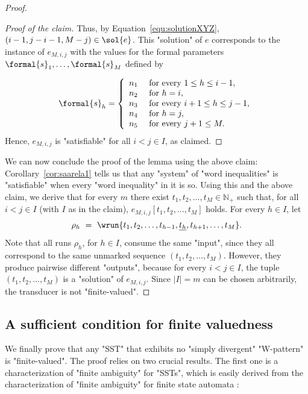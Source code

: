 \documentclass{theoretics}
\begin{document}
\begin{proof}
\begin{proof}[Proof of the claim]
Thus, by Equation~\eqref{equ:solutionXYZ},
$(i - 1, j - i - 1, M - j) \in \sol{e}$. 
This "solution" of $e$ corresponds to the instance of  $e_{M,i,j}$ 
with the values for the formal parameters $\formal{s}_1,\dots,\formal{s}_M$
defined by

\[
\formal{s}_h = \left\{
\begin{array}{lll}
n_1 & \textup{ for every } 1 \leq h \leq i-1,\\
n_2 & \textup{ for } h = i,\\
n_3 & \textup{ for every } i+1 \leq h \leq j-1,\\
n_4 & \textup{ for } h = j,\\
n_5 & \textup{ for every } j+1 \leq M.
\end{array}
\right.
\]
Hence, $e_{M,i,j}$ is "satisfiable" for all $i<j \in I$, as claimed.
\end{proof}

We can now conclude the proof of the lemma using the above claim:
Corollary~\ref{cor:saarela1} tells us that any "system" of "word inequalities" 
is "satisfiable" when every "word inequality" in it is so.
Using this and the above claim, we derive that for every $m$ there exist 
$t_1,t_2,\ldots,t_M \in \mathbb{N}_+$ such that, for all $i<j\in I$ (with $I$ as in the claim),
$e_{M,i,j}[t_1,t_2,\ldots,t_M]$ holds.
For every $h \in I$, let
\[
    \rho_h ~=~ 
    \wrun{t_1,t_2,\ldots,t_{h-1},\underline{t_{h}},t_{h+1}, \ldots ,t_M}.
\]
Note that all runs $\rho_h$, for $h \in I$, consume the same "input",
since they all correspond to the same unmarked sequence
$(t_1,t_2,\ldots, t_M)$.
However, they produce pairwise different "outputs", because 
for every $i<j \in I$, the tuple $(t_1,t_2,\ldots,t_M)$
is a "solution" of $e_{M,i,j}$. 
Since $|I|=m$ can be chosen arbitrarily, the transducer is not "finite-valued". 
\end{proof}

\subsection{A sufficient condition for finite valuedness}
\label{subsec:right-to-left}

We finally prove that  any "SST" that exhibits  no 
"simply divergent" "W-pattern" is "finite-valued".
The proof relies on two crucial results.
The first one is a characterization of "finite ambiguity"
for "SSTs", which is easily derived from  the characterization
of "finite ambiguity" for finite state automata
\cite{finite-ambiguity1977simon,finite-ambiguity1977jacob,seidl91,AllauzenMR11}:
\end{document}
